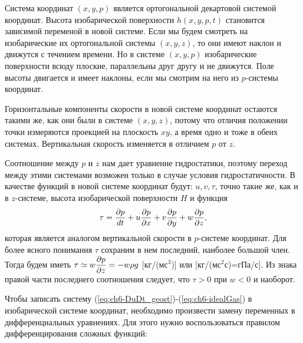     Система координат $(x,y,p)$ является ортогональной декартовой системой координат. Высота изобарической поверхности $h(x,y,p,t)$ становится зависимой переменой в новой системе. Если мы будем смотреть на изобарические их ортогональной системы $(x,y,z)$, то они имеют наклон и движутся с течением времени. Но в системе $(x,y,p)$ изобарические поверхности всюду плоские, параллельны друг другу и не движутся. Поле высоты двигается и имеет наклоны, если мы смотрим на него из $p$-системы координат. 

    Горизонтальные компоненты скорости в новой системе координат остаются такими же, как они были в системе $(x,y,z)$, потому что отличия положении точки измеряются проекцией на плоскость $xy$, а время одно и тоже в обеих системах. Вертикальная скорость изменяется в отличием $p$ от $z$.

    Соотношение между $p$ и $z$ нам дает уравнение гидростатики, поэтому переход между этими системами возможен только в случае условия гидростатичности. В качестве функций в новой системе координат будут: $u,v,\tau$, точно такие же, как и в $z$-системе, высота изобарической поверхности $H$ и функция 
    \begin{equation}
        \label{eq:tau}
        \tau=\displaystyle\frac{\partial p}{dt}+ u\frac{\partial p}{\partial x}+v\frac{\partial p}{\partial y}+w\frac{\partial p}{\partial z},
    \end{equation}
    которая является аналогом вертикальной скорости в $p$-системе координат. Для более ясного понимания $\tau$ сохраним в нем последний, наиболее большой член. Тогда будем иметь $\tau\simeq w\displaystyle\frac{\partial p}{\partial z}=-w\rho g$ [кг/(мс$^3$)] или [кг/(мс$^2$с)=гПа/с]. Из знака правой части последнего соотношения следует, что $\tau>0$ при $w<0$ и наоборот.

    Чтобы записать систему (\ref{eq:ch6-DuDt_geost})-(\ref{eq:ch6-idealGas}) в изобарической системе координат, необходимо произвести замену переменных в дифференциальных уравнениях. Для этого нужно воспользоваться правилом дифференцирования сложных функций:


